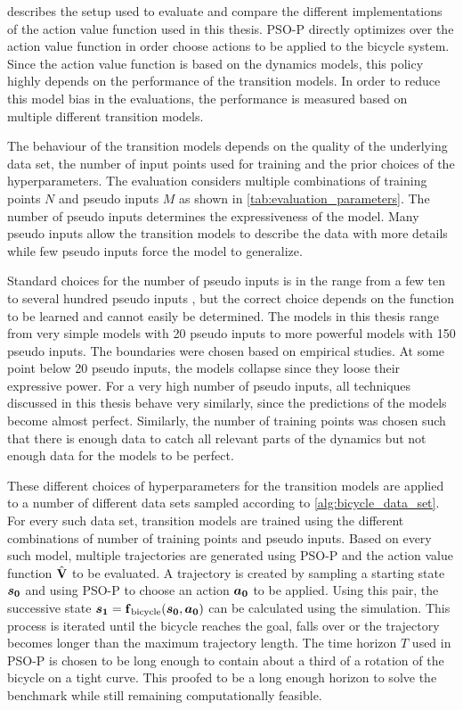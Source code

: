  describes the setup used to evaluate and compare the different implementations of the action value function used in this thesis.
PSO-P directly optimizes over the action value function in order choose actions to be applied to the bicycle system.
Since the action value function is based on the dynamics models, this policy highly depends on the performance of the transition models.
In order to reduce this model bias in the evaluations, the performance is measured based on multiple different transition models.

The behaviour of the transition models depends on the quality of the underlying data set, the number of input points used for training and the prior choices of the hyperparameters.
The evaluation considers multiple combinations of training points $N$ and pseudo inputs $M$ as shown in \cref{tab:evaluation_parameters}.
The number of pseudo inputs determines the expressiveness of the model.
Many pseudo inputs allow the transition models to describe the data with more details while few pseudo inputs force the model to generalize.

Standard choices for the number of pseudo inputs is in the range from a few ten to several hundred pseudo inputs \cite{snelson_flexible_2007}, but the correct choice depends on the function to be learned and cannot easily be determined.
The models in this thesis range from very simple models with 20 pseudo inputs to more powerful models with 150 pseudo inputs.
The boundaries were chosen based on empirical studies.
At some point below 20 pseudo inputs, the models collapse since they loose their expressive power.
For a very high number of pseudo inputs, all techniques discussed in this thesis behave very similarly, since the predictions of the models become almost perfect.
Similarly, the number of training points was chosen such that there is enough data to catch all relevant parts of the dynamics but not enough data for the models to be perfect.

These different choices of hyperparameters for the transition models are applied to a number of different data sets sampled according to \cref{alg:bicycle_data_set}.
For every such data set, transition models are trained using the different combinations of number of training points and pseudo inputs.
Based on every such model, multiple trajectories are generated using PSO-P and the action value function $\operatorname{\hat{\operatorname{\mathbf{V}}}}$ to be evaluated.
A trajectory is created by sampling a starting state $\bm{s_0}$ and using PSO-P to choose an action $\bm{a_0}$ to be applied.
Using this pair, the successive state $\bm{s_1} = \operatorname{\operatorname{\mathbf{f}}_{\text{bicycle}}}(\bm{s_0}, \bm{a_0})$ can be calculated using the simulation.
This process is iterated until the bicycle reaches the goal, falls over or the trajectory becomes longer than the maximum trajectory length.
The time horizon $T$ used in PSO-P is chosen to be long enough to contain about a third of a rotation of the bicycle on a tight curve.
This proofed to be a long enough horizon to solve the benchmark while still remaining computationally feasible.

